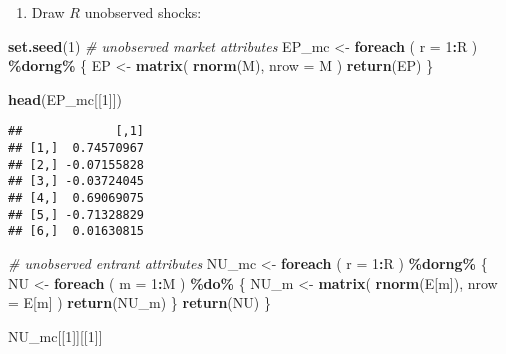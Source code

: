 \documentclass[
]{book}
\newenvironment{Shaded}{\begin{snugshade}}{\end{snugshade}}
\newcommand{\AttributeTok}[1]{\textcolor[rgb]{0.13,0.29,0.53}{#1}}
\newcommand{\CommentTok}[1]{\textcolor[rgb]{0.56,0.35,0.01}{\textit{#1}}}
\newcommand{\DecValTok}[1]{\textcolor[rgb]{0.00,0.00,0.81}{#1}}
\newcommand{\FunctionTok}[1]{\textcolor[rgb]{0.13,0.29,0.53}{\textbf{#1}}}
\newcommand{\NormalTok}[1]{#1}
\newcommand{\OtherTok}[1]{\textcolor[rgb]{0.56,0.35,0.01}{#1}}
\newcommand{\SpecialCharTok}[1]{\textcolor[rgb]{0.81,0.36,0.00}{\textbf{#1}}}
\providecommand{\tightlist}{%
  \setlength{\itemsep}{0pt}\setlength{\parskip}{0pt}}
\begin{document}
\begin{enumerate}
\def\labelenumi{\arabic{enumi}.}
\tightlist
\item
  Draw \(R\) unobserved shocks:
\end{enumerate}

\begin{Shaded}
\begin{Highlighting}[]
 \FunctionTok{set.seed}\NormalTok{(}\DecValTok{1}\NormalTok{)}
\CommentTok{\# unobserved market attributes}
\NormalTok{EP\_mc }\OtherTok{\textless{}{-}}
  \FunctionTok{foreach}\NormalTok{ (}
    \AttributeTok{r =} \DecValTok{1}\SpecialCharTok{:}\NormalTok{R}
\NormalTok{    ) }\SpecialCharTok{\%dorng\%}\NormalTok{ \{}
\NormalTok{    EP }\OtherTok{\textless{}{-}} 
      \FunctionTok{matrix}\NormalTok{(}
      \FunctionTok{rnorm}\NormalTok{(M),}
      \AttributeTok{nrow =}\NormalTok{ M}
\NormalTok{      )}
    \FunctionTok{return}\NormalTok{(EP)}
\NormalTok{  \}}


\FunctionTok{head}\NormalTok{(EP\_mc[[}\DecValTok{1}\NormalTok{]])}
\end{Highlighting}
\end{Shaded}

\begin{verbatim}
##             [,1]
## [1,]  0.74570967
## [2,] -0.07155828
## [3,] -0.03724045
## [4,]  0.69069075
## [5,] -0.71328829
## [6,]  0.01630815
\end{verbatim}

\begin{Shaded}
\begin{Highlighting}[]
\CommentTok{\# unobserved entrant attributes}
\NormalTok{NU\_mc }\OtherTok{\textless{}{-}}
  \FunctionTok{foreach}\NormalTok{ (}
    \AttributeTok{r =} \DecValTok{1}\SpecialCharTok{:}\NormalTok{R}
\NormalTok{    ) }\SpecialCharTok{\%dorng\%}\NormalTok{ \{}
\NormalTok{  NU }\OtherTok{\textless{}{-}}
    \FunctionTok{foreach}\NormalTok{ (}
      \AttributeTok{m =} \DecValTok{1}\SpecialCharTok{:}\NormalTok{M}
\NormalTok{      ) }\SpecialCharTok{\%do\%}\NormalTok{ \{}
\NormalTok{      NU\_m }\OtherTok{\textless{}{-}} 
        \FunctionTok{matrix}\NormalTok{(}
        \FunctionTok{rnorm}\NormalTok{(E[m]),}
        \AttributeTok{nrow =}\NormalTok{ E[m]}
\NormalTok{        )}
      \FunctionTok{return}\NormalTok{(NU\_m)}
\NormalTok{    \}}
  \FunctionTok{return}\NormalTok{(NU)}
\NormalTok{  \}}

\NormalTok{NU\_mc[[}\DecValTok{1}\NormalTok{]][[}\DecValTok{1}\NormalTok{]]}
\end{Highlighting}
\end{Shaded}
\end{document}
